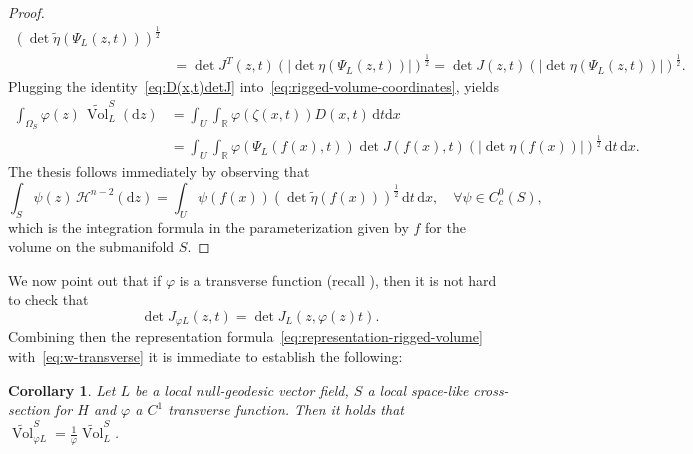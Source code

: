 \documentclass[12pt,a4paper]{amsart}
\theoremstyle{plain}
\newtheorem{corollary}[lemma]{Corollary}
\theoremstyle{definition}
\numberwithin{equation}{section}
\let\phi\varphi
\newcommand{\R}{\mathbb{R}}
\DeclareMathOperator{\vol}{Vol}
\newcommand{\de}{{\mathrm{d}}}
\newcommand{\haus}{\mathcal{H}}
\newcommand{\gflow}{\Psi}
\newcommand{\lparam}{\zeta}
\begin{document}
\begin{proof}
\begin{equation}
\begin{aligned}
      (\det \tilde\eta (\gflow_{L}(z,t)) )^{\frac{1}{2}}
      \\&
  =
  \det  J^T(z,t)
    (|\det \eta (\gflow_{L}(z,t)) |)^{\frac{1}{2}}
    =
  \det  J(z,t)
    (|\det \eta (\gflow_{L}(z,t)) |)^{\frac{1}{2}}.
  \end{aligned}
\end{equation}
%
Plugging the identity~\eqref{eq:D(x,t)detJ}
into~\eqref{eq:rigged-volume-coordinates}, yields
\begin{equation*}
  \begin{aligned}
     \int_{\Omega_S}
    \phi(z)
    \,
    \tilde{\vol}_L^S
    (\de z)
    &
    =
    \int_{U}
    \int_{\R}
    \phi(\lparam(x,t))
    D(x,t)
    \,
    \de t
      \de x
    \\
    &
      =
      \int_U
    \int_{\R}
    \phi(\gflow_L(f(x),t))
  \det  J(f(x),t)
  (|\det \eta (f(x)) |)^{\frac{1}{2}}
    \,
    \de t \,
      \de x
    .
 \end{aligned}
  \end{equation*}
  The thesis follows immediately by observing that
  \begin{equation*}
     \int_{S}
    \psi(z)
    \,
    \haus^{n-2}(\de z)
    =
    \int_{U}
    \psi(f(x))
    (\det \tilde\eta(f(x)))^{\frac{1}{2}}
    \,
    \de t
    \,
    \de x
    ,
    \quad
    \forall
    \psi
    \in
    C^0_c(S),
  \end{equation*}
  which is the integration formula in the
  parameterization given by $f$ for the volume on the submanifold $S$.
\end{proof}


We now point out that if  $\varphi $ is a transverse function (recall ), then 
it is not hard to check that 
%
\begin{equation}\label{eq:w-transverse}
\det J_{\varphi L}(z,t) = \det J_{L}(z,\varphi(z)t).
\end{equation}
%
Combining then the representation  formula~\eqref{eq:representation-rigged-volume}
  with~\eqref{eq:w-transverse} it is immediate to establish the following:

\begin{corollary} \label{cor:rescale-volume}
  Let $L$ be a local null-geodesic vector field, $S$ a local space-like
  cross-section for $H$ and $\varphi$ a $C^1$ transverse function.
  Then it holds that
  $\tilde{\vol}_{\varphi L}^S=\frac{1}{\varphi}\tilde{\vol}_{L}^S$.
\end{corollary}
\end{document}
